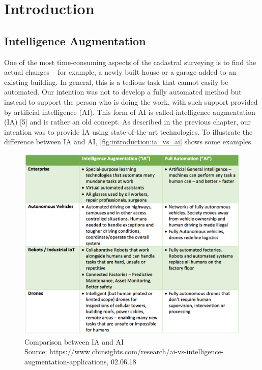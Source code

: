 
\chapter{Introduction}\label{chp:introduction}
\section{Intelligence Augmentation}
One of the most time-consuming aspects of the cadastral surveying is to find the actual changes – for example, a newly built house or a garage added to an existing building. In general, this is a tedious task that cannot easily be automated. Our intention was not to develop a fully automated method but instead to support the person who is doing the work, with such support provided by artificial intelligence (AI). This form of AI is called intelligence augmentation (IA) [5] and is rather an old concept. As described in the previous chapter, our intention was to provide IA using state-of-the-art technologies. To illustrate the difference between IA and AI, \autoref{fig:introduction:ia_vs_ai} shows some examples.

\begin{figure}[H]
    \centering
	\includegraphics[width=0.9\linewidth]{chapters/introduction/images/ia_vs_ai.png}
	\caption{Comparison between IA and AI\\Source: https://www.cbinsights.com/research/ai-vs-intelligence-augmentation-applications, 02.06.18}
	\label{fig:introduction:ia_vs_ai}
\end{figure}


